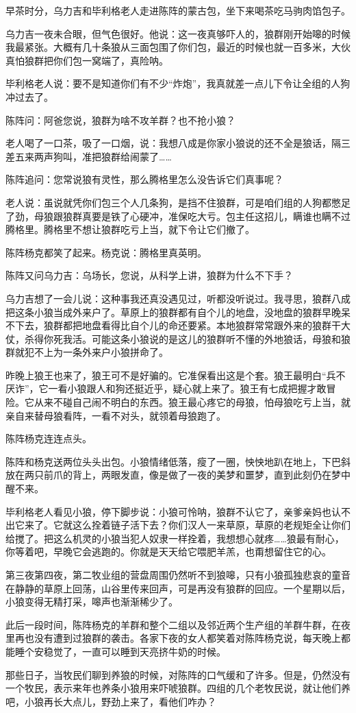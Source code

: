 \par 早茶时分，乌力吉和毕利格老人走进陈阵的蒙古包，坐下来喝茶吃马驹肉馅包子。
\par 乌力吉一夜未合眼，但气色很好。他说：这一夜真够吓人的，狼群刚开始嗥的时候我最紧张。大概有几十条狼从三面包围了你们包，最近的时候也就一百多米，大伙真怕狼群把你们包一窝端了，真险呐。
\par 毕利格老人说：要不是知道你们有不少“炸炮”，我真就差一点儿下令让全组的人狗冲过去了。
\par 陈阵问：阿爸您说，狼群为啥不攻羊群？也不抢小狼？
\par 老人喝了一口茶，吸了一口烟，说：我想八成是你家小狼说的还不全是狼话，隔三差五来两声狗叫，准把狼群给闹蒙了……
\par 陈阵追问：您常说狼有灵性，那么腾格里怎么没告诉它们真事呢？
\par 老人说：虽说就凭你们包三个人几条狗，是挡不住狼群，可是咱们组的人狗都憋足了劲，母狼跟狼群真要是铁了心硬冲，准保吃大亏。包主任这招儿，瞒谁也瞒不过腾格里。腾格里不想让狼群吃亏上当，就下令让它们撤了。
\par 陈阵杨克都笑了起来。杨克说：腾格里真英明。
\par 陈阵又问乌力吉：乌场长，您说，从科学上讲，狼群为什么不下手？
\par 乌力吉想了一会儿说：这种事我还真没遇见过，听都没听说过。我寻思，狼群八成把这条小狼当成外来户了。草原上的狼群都有自个儿的地盘，没地盘的狼群早晚呆不下去，狼群都把地盘看得比自个儿的命还要紧。本地狼群常常跟外来的狼群干大仗，杀得你死我活。可能这条小狼说的是这儿的狼群听不懂的外地狼话，母狼和狼群就犯不上为一条外来户小狼拼命了。
\par 昨晚上狼王也来了，狼王可不是好骗的。它准保看出这是个套。狼王最明白“兵不厌诈”，它一看小狼跟人和狗还挺近乎，疑心就上来了。狼王有七成把握才敢冒险。它从来不碰自己闹不明白的东西。狼王最心疼它的母狼，怕母狼吃亏上当，就亲自来替母狼看阵，一看不对头，就领着母狼跑了。
\par 陈阵杨克连连点头。
\par 陈阵和杨克送两位头头出包。小狼情绪低落，瘦了一圈，怏怏地趴在地上，下巴斜放在两只前爪的背上，两眼发直，像是做了一夜的美梦和噩梦，直到此刻仍在梦中醒不来。
\par 毕利格老人看见小狼，停下脚步说：小狼可怜呐，狼群不认它了，亲爹亲妈也认不出它来了。它就这么拴着链子活下去？你们汉人一来草原，草原的老规矩全让你们给搅了。把这么机灵的小狼当犯人奴隶一样拴着，我想想心就疼……狼最有耐心，你等着吧，早晚它会逃跑的。你就是天天给它喂肥羊羔，也甭想留住它的心。
\par 第三夜第四夜，第二牧业组的营盘周围仍然听不到狼嗥，只有小狼孤独悲哀的童音在静静的草原上回荡，山谷里传来回声，可是再没有狼群的回应。一个星期以后，小狼变得无精打采，嗥声也渐渐稀少了。
\par 此后一段时间，陈阵杨克的羊群和整个二组以及邻近两个生产组的羊群牛群，在夜里再也没有遭到过狼群的袭击。各家下夜的女人都笑着对陈阵杨克说，每天晚上都能睡个安稳觉了，一直可以睡到天亮挤牛奶的时候。
\par 那些日子，当牧民们聊到养狼的时候，对陈阵的口气缓和了许多。但是，仍然没有一个牧民，表示来年也养条小狼用来吓唬狼群。四组的几个老牧民说，就让他们养吧，小狼再长大点儿，野劲上来了，看他们咋办？


